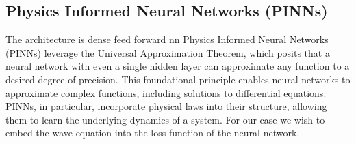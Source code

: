 \documentclass[twoside,11pt]{report}
\begin{document}
\subsection{Physics Informed Neural Networks (PINNs)}
\label{sec:DNN}
    
    The architecture is dense feed forward nn
    Physics Informed Neural Networks (PINNs) leverage the Universal Approximation Theorem, which posits 
    that a neural network with even a single hidden layer can approximate any function to a desired degree 
    of precision. This foundational principle enables neural networks to approximate complex functions, including 
    solutions to differential equations.
    PINNs, in particular, incorporate physical laws into their structure, allowing them to learn the underlying 
    dynamics of a system. For our case we wish to embed the wave equation into the loss function of the neural network.
\end{document}

